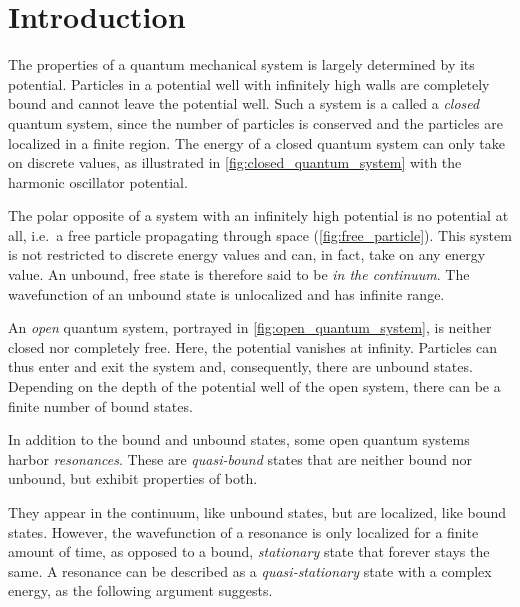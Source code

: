 \documentclass[../main/report.tex]{subfiles}
\begin{document}
\chapter{Introduction}

The properties of a quantum mechanical system is largely determined by its potential. 
Particles in a potential well with infinitely high walls are completely bound and cannot leave the potential well.
Such a system is a called a \emph{closed} quantum system, since the number of particles is conserved and the particles are localized in a finite region. 
The energy of a closed quantum system can only take on discrete values, as illustrated in \cref{fig:closed_quantum_system} with the harmonic oscillator potential.

The polar opposite of a system with an infinitely high potential is no potential at all, i.e.~a free particle propagating through space (\cref{fig:free_particle}).
This system is not restricted to discrete energy values and can, in fact, take on any energy value.
An unbound, free state is therefore said to be \emph{in the continuum}.
The wavefunction of an unbound state is unlocalized and has infinite range.

An \emph{open} quantum system, portrayed in \cref{fig:open_quantum_system}, is neither closed nor completely free.
Here, the potential vanishes at infinity.
Particles can thus enter and exit the system and, consequently, there are unbound states.
Depending on the depth of the potential well of the open system, there can be a finite number of bound states.

In addition to the bound and unbound states, some open quantum systems harbor \emph{resonances}. 
These are \emph{quasi-bound} states that are neither bound nor unbound, but exhibit properties of both. 

They appear in the continuum, like unbound states, but are localized, like bound states.
However, the wavefunction of a resonance is only localized for a finite amount of time, as opposed to a bound, \emph{stationary} state that forever stays the same.
A resonance can be described as a \emph{quasi-stationary} state with a complex energy, as the following argument suggests.

\end{document}
